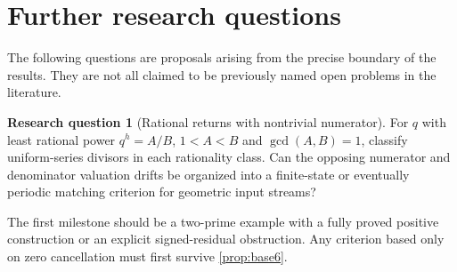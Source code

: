 \documentclass[11pt,letterpaper]{article}
\theoremstyle{definition}
\newtheorem{question}{Research question}
\theoremstyle{remark}
\numberwithin{equation}{section}
\begin{document}
\section{Further research questions}\label{sec:questions}
The following questions are proposals arising from the precise boundary of the results. They are not all claimed to be previously named open problems in the literature.

\begin{question}[Rational returns with nontrivial numerator]
For $q$ with least rational power $q^h=A/B$, $1<A<B$ and $\gcd(A,B)=1$, classify uniform-series divisors in each rationality class. Can the opposing numerator and denominator valuation drifts be organized into a finite-state or eventually periodic matching criterion for geometric input streams?
\end{question}
The first milestone should be a two-prime example with a fully proved positive construction or an explicit signed-residual obstruction. Any criterion based only on zero cancellation must first survive \cref{prop:base6}.
\end{document}
